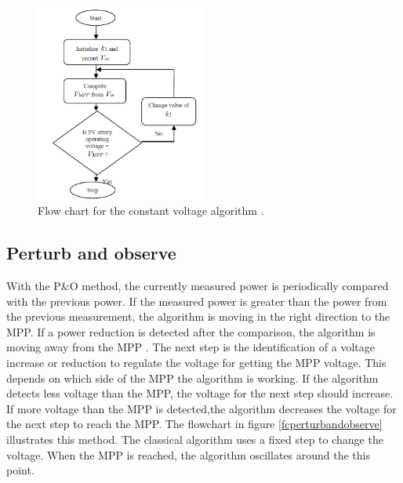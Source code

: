 \begin{figure}[H]
	\begin{center}
		\includegraphics[width=0.5\textwidth]{../Pictures/P1/Flow_chart/Flow_chart_constant_voltage}
		\caption{Flow chart for the constant voltage algorithm \cite{flowchartVC}. }
		\label{fcconstantvoltage}
	\end{center}	
\end{figure}


\subsection{Perturb and observe}
With the P\&O method, the currently measured power is periodically compared with the previous power. If the measured power is greater than the power from the previous measurement, the algorithm is moving in the right direction to the MPP. If a power reduction is detected after the comparison, the algorithm is moving away from the MPP . The next step is the identification of a voltage increase or reduction to regulate the voltage for getting the MPP voltage. This depends on which side of the MPP the algorithm is working. If the algorithm detects less voltage than the MPP, the voltage for the next step should increase. If more voltage than the MPP is detected,the algorithm decreases the voltage for the next step to reach the MPP.
The flowchart in figure \ref{fcperturbandobserve} illustrates this method. The classical algorithm uses a fixed step to change the voltage. When the MPP is reached, the algorithm oscillates around the this point. \cite{flowchartVC}

